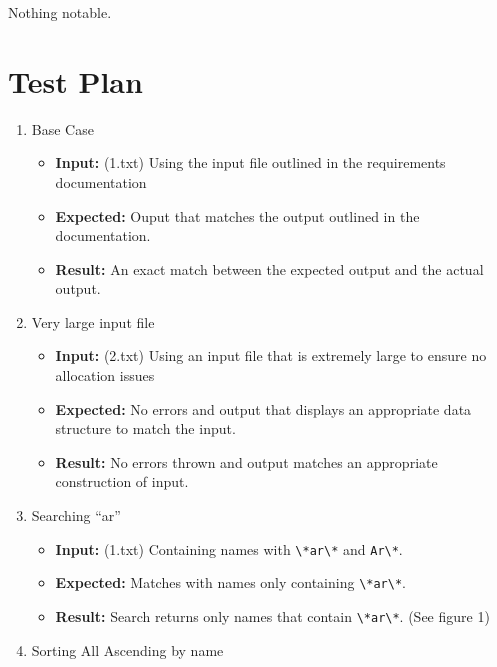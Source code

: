 \documentclass[english,floatsintext,man]{apa6}
\providecommand{\tightlist}{%
  \setlength{\itemsep}{0pt}\setlength{\parskip}{0pt}}
\begin{document}
Nothing notable.

\section{Test Plan}\label{test-plan}

\begin{enumerate}
\def\labelenumi{\arabic{enumi}.}
\tightlist
\item
  Base Case

  \begin{itemize}
  \tightlist
  \item
    \textbf{Input:} (1.txt) Using the input file outlined in the
    requirements documentation
  \item
    \textbf{Expected:} Ouput that matches the output outlined in the
    documentation.
  \item
    \textbf{Result:} An exact match between the expected output and the
    actual output.
  \end{itemize}
\item
  Very large input file

  \begin{itemize}
  \tightlist
  \item
    \textbf{Input:} (2.txt) Using an input file that is extremely large
    to ensure no allocation issues
  \item
    \textbf{Expected:} No errors and output that displays an appropriate
    data structure to match the input.
  \item
    \textbf{Result:} No errors thrown and output matches an appropriate
    construction of input.
  \end{itemize}
\item
  Searching \enquote{ar}

  \begin{itemize}
  \tightlist
  \item
    \textbf{Input:} (1.txt) Containing names with
    \texttt{\textbackslash{}*ar\textbackslash{}*} and
    \texttt{Ar\textbackslash{}*}.
  \item
    \textbf{Expected:} Matches with names only containing
    \texttt{\textbackslash{}*ar\textbackslash{}*}.
  \item
    \textbf{Result:} Search returns only names that contain
    \texttt{\textbackslash{}*ar\textbackslash{}*}. (See figure 1)
  \end{itemize}
\item
  Sorting All Ascending by name


\end{enumerate}
\end{document}
